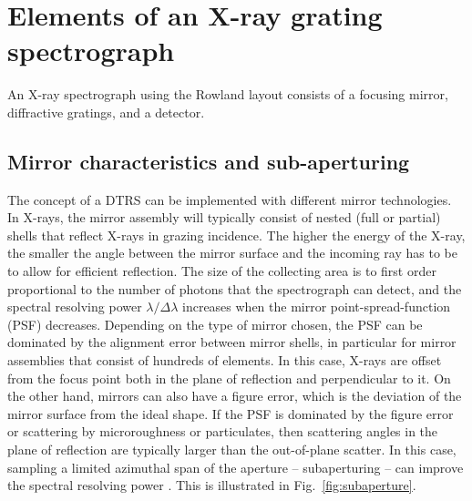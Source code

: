 \documentclass[linenumbers]{aastex631}
\begin{document}
\section{Elements of an X-ray grating spectrograph}
\label{sect:elements}
An X-ray spectrograph using the Rowland layout consists of a focusing mirror, diffractive gratings, and a detector.

\subsection{Mirror characteristics and sub-aperturing}
The concept of a DTRS can be implemented with different mirror technologies. In X-rays, the mirror assembly will typically consist of nested (full or partial) shells that reflect X-rays in grazing incidence. The higher the energy of the X-ray, the smaller the angle between the mirror surface and the incoming ray has to be to allow for efficient reflection. The size of the collecting area is to first order proportional to the number of photons that the spectrograph can detect, and the spectral resolving power $\lambda / \Delta \lambda$ increases when the mirror point-spread-function (PSF) decreases. Depending on the type of mirror chosen, the PSF can be dominated by the alignment error between mirror shells, in particular for mirror assemblies that consist of hundreds of elements. In this case, X-rays are offset from the focus point both in the plane of reflection and perpendicular to it.
On the other hand, mirrors can also have a figure error, which is the deviation of the mirror surface from the ideal shape. If the PSF is dominated by the figure error or scattering by microroughness or particulates, then scattering angles in the plane of reflection are typically larger than the out-of-plane scatter. In this case, sampling a limited azimuthal span of the aperture -- subaperturing -- can improve the spectral resolving power \citep{1987ApOpt..26.2915C,2010SPIE.7732E..1JH}. This is illustrated in Fig.~\ref{fig:subaperture}.
\end{document}
